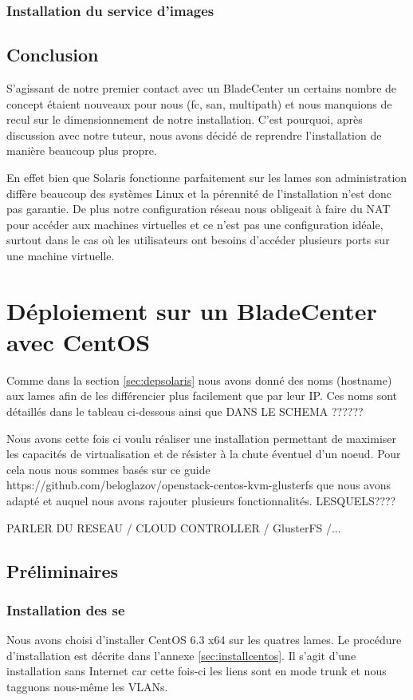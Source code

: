 \documentclass[a4paper,oneside]{report}
\begin{document}
\subsubsection{Installation du service d'images}

\subsection{Conclusion}
S'agissant de notre premier contact avec un BladeCenter un certains nombre de concept étaient nouveaux pour nous (\gls{fc}, \gls{san}, multipath) et nous manquions de recul sur le dimensionnement de notre installation.
C'est pourquoi, après discussion avec notre tuteur, nous avons décidé de reprendre l'installation de manière beaucoup plus propre.

En effet bien que Solaris fonctionne parfaitement sur les lames son administration diffère beaucoup des systèmes Linux et la pérennité de l'installation n'est donc pas garantie.\newline
De plus notre configuration réseau nous obligeait à faire du NAT pour accéder aux machines virtuelles et ce n'est pas une configuration idéale, surtout dans le cas où les utilisateurs ont besoins d'accéder plusieurs ports sur une machine virtuelle.


\section{Déploiement sur un BladeCenter avec CentOS}
Comme dans la section \ref{sec:depsolaris} nous avons donné des noms (hostname) aux lames afin de les différencier plus facilement que par leur IP.
Ces noms sont détaillés dans le tableau ci-dessous ainsi que DANS LE SCHEMA ??????

Nous avons cette fois ci voulu réaliser une installation permettant de maximiser les capacités de virtualisation et de résister à la chute éventuel d'un noeud.
Pour cela nous nous sommes basés sur ce guide https://github.com/beloglazov/openstack-centos-kvm-glusterfs que nous avons adapté et auquel nous avons rajouter plusieurs fonctionnalités. LESQUELS????

PARLER DU RESEAU / CLOUD CONTROLLER / GlusterFS /...

\subsection{Préliminaires}
\subsubsection{Installation des \gls{se}}
Nous avons choisi d'installer CentOS 6.3 x64 sur les quatres lames. Le procédure d'installation est décrite dans l'annexe \ref{sec:installcentos}.\newline
Il s'agit d'une installation sans Internet car cette fois-ci les liens sont en mode trunk et nous tagguons nous-même les VLANs.
\end{document}
